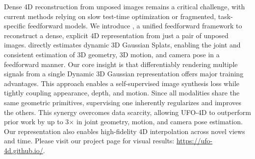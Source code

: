 
Dense 4D reconstruction from unposed images remains a critical challenge, with current methods relying on slow test-time optimization or fragmented, task-specific feedforward models. We introduce \ourmethod{}, a unified feedforward framework to reconstruct a dense, explicit 4D representation from just a pair of unposed images.  \ourmethod{} directly estimates dynamic 3D Gaussian Splats, enabling the joint and consistent estimation of 3D geometry, 3D motion, and camera pose in a feedforward manner. 
Our core insight is that differentiably rendering multiple signals from a single Dynamic 3D Gaussian representation offers major training advantages.
This approach enables a self-supervised image synthesis loss while tightly coupling appearance, depth, and motion. Since all modalities share the same geometric primitives, supervising one inherently regularizes and improves the others. 
This synergy overcomes data scarcity, allowing UFO-4D to outperform prior work by up to 3$\times$ in joint geometry, motion, and camera pose estimation.
Our representation also enables high-fidelity 4D interpolation across novel views and time.
Please visit our project page for visual results: \url{https://ufo-4d.github.io/}.

